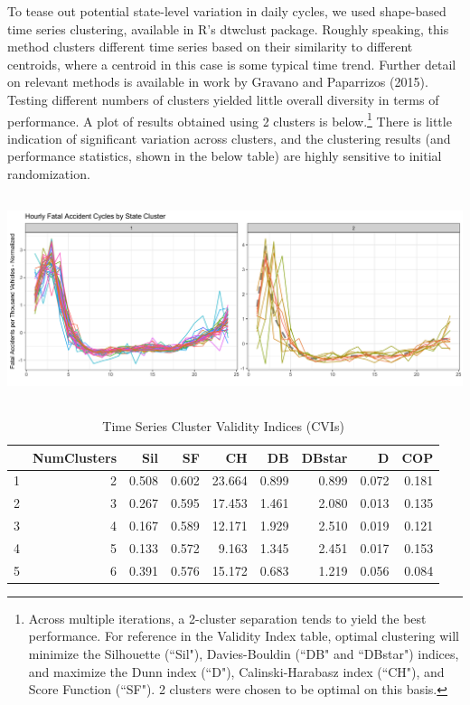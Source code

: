 \documentclass[11pt, oneside,titlepage]{article}   	%
\begin{document}
To tease out potential state-level variation in daily cycles, we used shape-based time series clustering, available in R's dtwclust package. Roughly speaking, this method clusters different time series based on their similarity to different centroids, where a centroid in this case is some typical time trend. Further detail on relevant methods is available in work by Gravano and Paparrizos (2015). Testing different numbers of clusters yielded little overall diversity in terms of performance. A plot of results obtained using 2 clusters is below.\footnote{Across multiple iterations, a 2-cluster separation tends to yield the best performance. For reference in the Validity Index table, optimal clustering will minimize the Silhouette (``Sil"), Davies-Bouldin (``DB" and ``DBstar") indices, and maximize the Dunn index (``D"), Calinski-Harabasz index (``CH"), and Score Function (``SF"). 2 clusters were chosen to be optimal on this basis.} There is little indication of significant variation across clusters, and the clustering results (and performance statistics, shown in the below table) are highly sensitive to initial randomization. 

\begin{center}
\includegraphics[width=.75\textwidth,height=6cm,keepaspectratio]{StateClusterPlot_Hourly.png}
\end{center}

\begin{table}[H]
\centering
\begin{tabular}{rrrrrrrrr}
  \hline
 & NumClusters & Sil & SF & CH & DB & DBstar & D & COP \\ 
  \hline
1 & 2 & 0.508 & 0.602 & 23.664 & 0.899 & 0.899 & 0.072 & 0.181 \\ 
  2 & 3 & 0.267 & 0.595 & 17.453 & 1.461 & 2.080 & 0.013 & 0.135 \\ 
  3 & 4 & 0.167 & 0.589 & 12.171 & 1.929 & 2.510 & 0.019 & 0.121 \\ 
  4 & 5 & 0.133 & 0.572 & 9.163 & 1.345 & 2.451 & 0.017 & 0.153 \\ 
  5 & 6 & 0.391 & 0.576 & 15.172 & 0.683 & 1.219 & 0.056 & 0.084 \\ 
   \hline
\end{tabular}
\caption{Time Series Cluster Validity Indices (CVIs)} 
\end{table}
\end{document}
